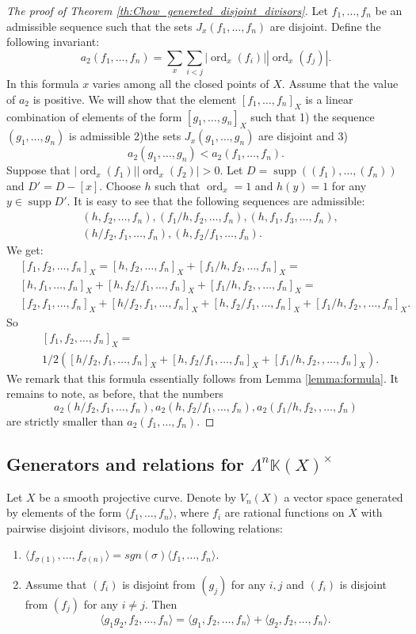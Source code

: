 \documentclass[12pt]{extarticle}
\def\mb{\mathbb}
\def\k{\mb K}
\newcommand{\EP}[2]{{\Lambda^{#1}\k(#2)^\times}}
\DeclareMathOperator{\ord}{ord}
\DeclareMathOperator{\supp}{supp}
\begin{document}
\begin{proof}[The proof of Theorem \ref{th:Chow_genereted_disjoint_divisors}]
Let $f_1,\dots, f_n$ be an admissible sequence such that the sets $J_x(f_1,\dots, f_n)$ are disjoint. Define the following invariant:
$$a_2(f_1,\dots, f_n)=\sum\limits_x\sum\limits_{i<j} |\ord_x(f_i)||\ord_x(f_j)|.$$
In this formula $x$ varies among all the closed points of $X$.
Assume that the value of $a_2$ is positive. We will show that the element $[f_1,\dots, f_n]_X$ is a linear combination of elements of the form $[g_1,\dots, g_n]_X$ such that 1) the sequence $(g_1,\dots, g_n)$ is admissible 2)the sets $J_x(g_1,\dots, g_n)$ are disjoint and 3) $$a_2(g_1,\dots, g_n)<a_2(f_1,\dots, f_n).$$ Suppose that $|\ord_{x}(f_1)||\ord_{x}(f_2)|>0$. Let $D=\supp((f_1),\dots, (f_n))$ and $D'=D-[x]$. Choose $h$ such that $\ord_{x}=1$ and $h(y)=1$ for any $y\in \supp D'$. It is easy to see that the following sequences are admissible: 
\begin{align*}
    &(h,f_2,\dots, f_n), (f_1/h,f_2,\dots, f_n), (h,f_1,f_3,\dots, f_n), \\
    & (h/f_2,f_1,\dots, f_n), (h,f_2/f_1,\dots, f_n).
\end{align*} 
We get:
\begin{align*}
    &[f_1,f_2,\dots, f_n]_X=[h,f_2,\dots, f_n]_X+[f_1/h,f_2,\dots, f_n]_X=\\
    &[h,f_1,\dots, f_n]_X+[h,f_2/f_1,\dots, f_n]_X+[f_1/h,f_2,,\dots, f_n]_X=\\
    &[f_2,f_1,\dots, f_n]_X+[h/f_2,f_1,\dots, f_n]_X+[h,f_2/f_1,\dots, f_n]_X+[f_1/h,f_2,,\dots, f_n]_X.
\end{align*}
So
\begin{align*}
    &[f_1,f_2,\dots, f_n]_X=\\
    &1/2([h/f_2,f_1,\dots, f_n]_X+[h,f_2/f_1,\dots, f_n]_X+[f_1/h,f_2,,\dots, f_n]_X).
\end{align*}
We remark that this formula essentially follows from Lemma \ref{lemma:formula}. It remains to note, as before, that the numbers $$a_2(h/f_2,f_1,\dots, f_n), a_2(h,f_2/f_1,\dots, f_n), a_2(f_1/h,f_2,,\dots, f_n)$$ are strictly smaller than $a_2(f_1,\dots, f_n).$
\end{proof}




\subsection{Generators and relations for $\EP{n}{X}$}
Let $X$ be a smooth projective curve. Denote by $V_n(X)$ a vector space generated by elements of the form $\langle f_1,\dots,f_n\rangle$, where $f_i$ are rational functions on $X$ with pairwise disjoint divisors, modulo the following relations:
\begin{enumerate}
    \item $\langle f_{\sigma(1)},\dots, f_{\sigma(n)}\rangle=sgn(\sigma)\langle f_1,\dots,f_n\rangle.$
    \item Assume that $(f_i)$ is disjoint from $(g_j)$ for any $i,j$ and $(f_i)$ is disjoint from $(f_j)$ for any $i\ne j$. Then $$\langle g_1g_2,f_2,\dots, f_n\rangle=\langle g_1,f_2,\dots, f_n\rangle+\langle g_2,f_2,\dots, f_n\rangle.$$ 
\end{enumerate}
\end{document}
